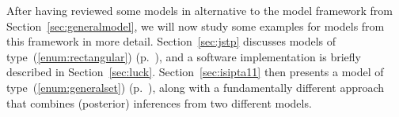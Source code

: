 \medskip

After having reviewed some models in alternative to the model framework from Section~\ref{sec:generalmodel},
we will now study some examples for models from this framework in more detail.
Section~\ref{sec:jstp} discusses models of type~(\ref{enum:rectangular}) (p.~\pageref{enum:rectangular}),
and a software implementation is briefly described in Section~\ref{sec:luck}.
Section~\ref{sec:isipta11} then presents a model of type~(\ref{enum:generalset}) (p.~\pageref{enum:generalset}),
along with a fundamentally different approach that combines (posterior) inferences from two different models.

